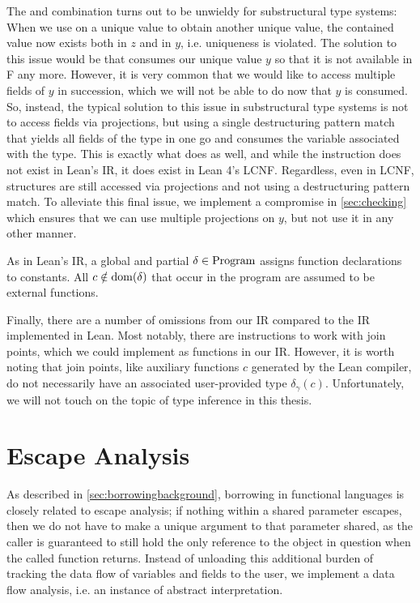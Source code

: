 The  and  combination turns out to be unwieldy for substructural type systems: When we use  on a unique value to obtain another unique value, the contained value now exists both in $z$ and in $y$, i.e. uniqueness is violated. The solution to this issue would be that  consumes our unique value $y$ so that it is not available in F any more. However, it is very common that we would like to access multiple fields of $y$ in succession, which we will not be able to do now that $y$ is consumed. So, instead, the typical solution to this issue in substructural type systems is not to access fields via projections, but using a single destructuring pattern match that yields all fields of the type in one go and consumes the variable associated with the type. This is exactly what  does as well, and while the instruction does not exist in Lean's IR, it does exist in Lean 4's LCNF. Regardless, even in LCNF, structures are still accessed via projections and not using a destructuring pattern match. To alleviate this final issue, we implement a compromise in \cref{sec:checking} which ensures that we can use multiple projections on $y$, but not use it in any other manner.

As in Lean's IR, a global and partial $\delta \in \mathrm{Program}$ assigns function declarations to constants. All $c \notin \mathrm{dom}(\delta)$ that occur in the program are assumed to be external functions.

Finally, there are a number of omissions from our IR compared to the IR implemented in Lean. Most notably, there are instructions to work with join points, which we could implement as functions in our IR. However, it is worth noting that join points, like auxiliary functions $c$ generated by the Lean compiler, do not necessarily have an associated user-provided type $\delta_\gamma(c)$. Unfortunately, we will not touch on the topic of type inference in this thesis.

\newcommand{\Tag}{\mathrm{Tag}}
\newcommand{\Escapee}{\mathrm{Escapee}}
\newcommand{\ExternFunEscapees}{\mathrm{ExternFunEscapees}}

\section{Escape Analysis}\label{sec:escapeanalysis}
As described in \cref{sec:borrowingbackground}, borrowing in functional languages is closely related to escape analysis; if nothing within a shared parameter escapes, then we do not have to make a unique argument to that parameter shared, as the caller is guaranteed to still hold the only reference to the object in question when the called function returns. Instead of unloading this additional burden of tracking the data flow of variables and fields to the user, we implement a data flow analysis, i.e. an instance of abstract interpretation.

